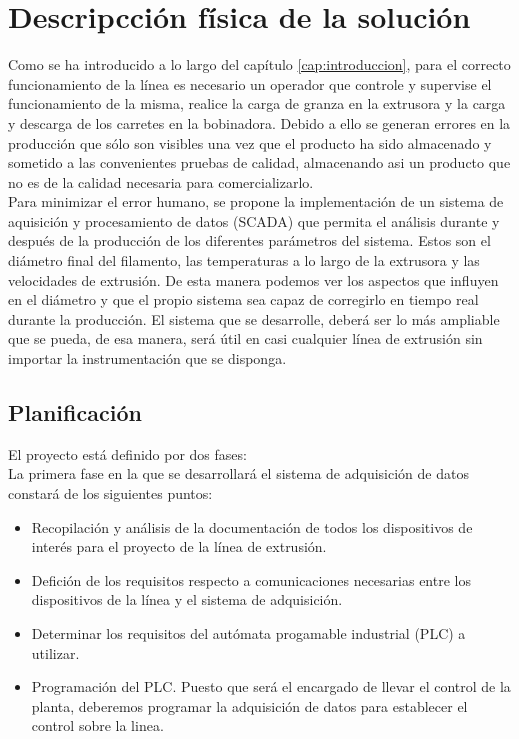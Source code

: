 \chapter{Descripcción física de la solución}
\label{cap:descrip}

Como se ha introducido a lo largo del capítulo \ref{cap:introduccion}, para el correcto funcionamiento de la línea es necesario un operador que controle y supervise el funcionamiento de la misma, realice la carga de granza en la extrusora y la carga y descarga de los carretes en la bobinadora. Debido a ello se generan errores en la producción que sólo son visibles una vez que el producto ha sido almacenado y sometido a las convenientes pruebas de calidad, almacenando asi un producto que no es de la calidad necesaria para comercializarlo.\\

Para minimizar el error humano, se propone la implementación de un sistema de aquisición y procesamiento de datos (SCADA) que permita el análisis durante y después de la producción de los diferentes parámetros del sistema. Estos son el diámetro final del filamento, las temperaturas a lo largo de la extrusora y las velocidades de extrusión. De esta manera podemos ver los aspectos que influyen en el diámetro y que el propio sistema sea capaz de corregirlo en tiempo real durante la producción. El sistema que se desarrolle, deberá ser lo más ampliable que se pueda, de esa manera, será útil en casi cualquier línea de extrusión sin importar la instrumentación que se disponga.

\section{Planificación}
\label{sec:planificacion}

El proyecto está definido por dos fases:\\

La primera fase en la que se desarrollará el sistema de adquisición de datos constará de los siguientes puntos:

\begin{itemize}
    \item Recopilación y análisis de la documentación de todos los dispositivos de interés para el proyecto de la línea de extrusión.
    \item Defición de los requisitos respecto a comunicaciones necesarias entre los dispositivos de la línea y el sistema de adquisición.
    \item Determinar los requisitos del autómata progamable industrial (PLC) a utilizar.
    \item Programación del PLC. Puesto que será el encargado de llevar el control de la planta, deberemos programar la adquisición de datos para establecer el control sobre la linea.
\end{itemize}

